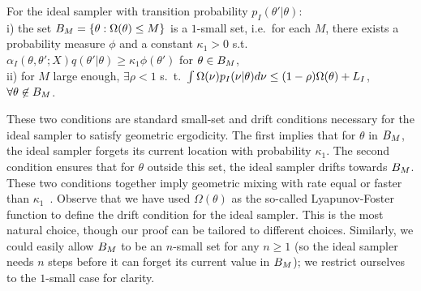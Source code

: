 \begin{assumption}
For the ideal sampler with transition probability $p_I(\theta'|\theta)$: \\
i) the set $B_M=\{\theta:\Omega(\theta)\le M \}$ is a $1$-small set,
i.e.\ for each $M$, there exists a probability measure $\phi$ and a constant
$\kappa_1 > 0$ s.t.\ %
$\alpha_I(\theta, \theta'; X) q(\theta' | \theta) \ge \kappa_1 \phi(\theta')$
 for $\theta \in B_M$, \\
ii) for $M$ large enough, $\exists \rho < 1$ s.\ t.\
$\int \Omega(\nu) p_I(\nu|\theta) d\nu
\leq (1-\rho) \Omega(\theta)+L_I$, $\forall \theta \not\in B_M$.
  \label{asmp:ideal_geom}
\end{assumption}
\noindent %
These two conditions are standard
small-set and drift conditions necessary for the ideal sampler to satisfy
geometric ergodicity. The first implies that for $\theta$ in
$B_M$, the ideal sampler forgets its current
location with probability $\kappa_1$. The second condition ensures that
for $\theta$ outside this set, the ideal sampler drifts towards
$B_M$. These two conditions together imply geometric
mixing with rate equal or faster than $\kappa_1$~\cite{meyn2009}.
Observe that we have used $\Omega(\theta)$ as the so-called 
Lyapunov-Foster function to define the drift condition for the ideal 
sampler. %
This is the most natural choice,
though our proof can be tailored to different choices. Similarly, we
could easily allow $B_M$ to be an $n$-small set for any $n\ge 1$ (so
the ideal sampler needs $n$ steps before it can forget its current
value in $B_M$); we restrict ourselves to the $1$-small case for
clarity.




